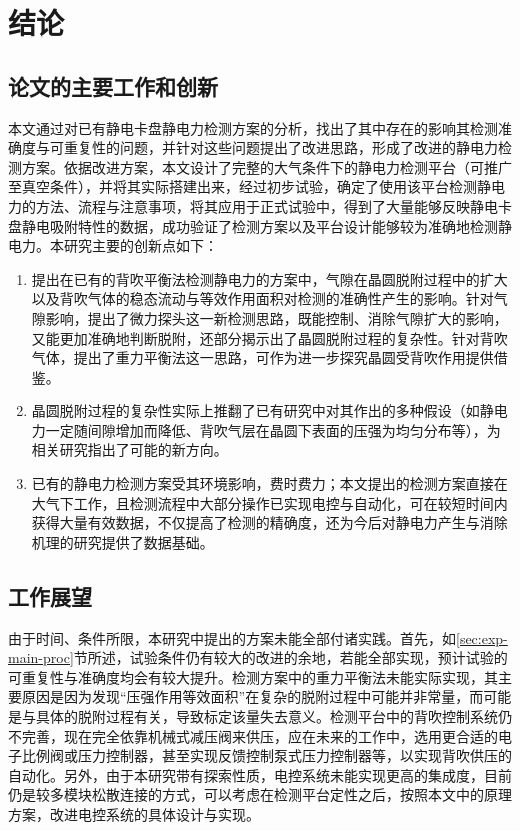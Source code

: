 \cleardoublepage
\chapter{结论}\label{ch:conclusion}


\section{论文的主要工作和创新}\label{sec:conclusion-review}

本文通过对已有静电卡盘静电力检测方案的分析，找出了其中存在的影响其检测准确度与可重复性的问题，并针对这些问题提出了改进思路，形成了改进的静电力检测方案。依据改进方案，本文设计了完整的大气条件下的静电力检测平台（可推广至真空条件），并将其实际搭建出来，经过初步试验，确定了使用该平台检测静电力的方法、流程与注意事项，将其应用于正式试验中，得到了大量能够反映静电卡盘静电吸附特性的数据，成功验证了检测方案以及平台设计能够较为准确地检测静电力。本研究主要的创新点如下：

\begin{enumerate}
  \item 提出在已有的背吹平衡法检测静电力的方案中，气隙在晶圆脱附过程中的扩大以及背吹气体的稳态流动与等效作用面积对检测的准确性产生的影响。针对气隙影响，提出了微力探头这一新检测思路，既能控制、消除气隙扩大的影响，又能更加准确地判断脱附，还部分揭示出了晶圆脱附过程的复杂性。针对背吹气体，提出了重力平衡法这一思路，可作为进一步探究晶圆受背吹作用提供借鉴。
  \item
  晶圆脱附过程的复杂性实际上推翻了已有研究中对其作出的多种假设（如静电力一定随间隙增加而降低、背吹气层在晶圆下表面的压强为均匀分布等），为相关研究指出了可能的新方向。
  \item 已有的静电力检测方案受其环境影响，费时费力；本文提出的检测方案直接在大气下工作，且检测流程中大部分操作已实现电控与自动化，可在较短时间内获得大量有效数据，不仅提高了检测的精确度，还为今后对静电力产生与消除机理的研究提供了数据基础。
\end{enumerate}


\section{工作展望}\label{sec:conclusion-future}

由于时间、条件所限，本研究中提出的方案未能全部付诸实践。首先，如\ref{sec:exp-main-proc}节所述，试验条件仍有较大的改进的余地，若能全部实现，预计试验的可重复性与准确度均会有较大提升。检测方案中的重力平衡法未能实际实现，其主要原因是因为发现“压强作用等效面积”在复杂的脱附过程中可能并非常量，而可能是与具体的脱附过程有关，导致标定该量失去意义。检测平台中的背吹控制系统仍不完善，现在完全依靠机械式减压阀来供压，应在未来的工作中，选用更合适的电子比例阀或压力控制器，甚至实现反馈控制泵式压力控制器等，以实现背吹供压的自动化。另外，由于本研究带有探索性质，电控系统未能实现更高的集成度，目前仍是较多模块松散连接的方式，可以考虑在检测平台定性之后，按照本文中的原理方案，改进电控系统的具体设计与实现。
